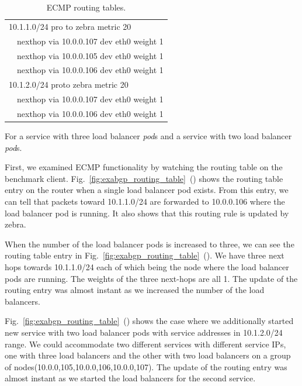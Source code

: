 {\begin{table}[h]
\begin{subtable}{.9\textwidth}
  \centering
  \begin{tabular}{ll}
    \hline
    \multicolumn{2}{l}{10.1.1.0/24 pro to zebra metric 20 } \\
    \hspace{15 mm}
    & nexthop via 10.0.0.107  dev eth0 weight 1 \\
    & nexthop via 10.0.0.105  dev eth0 weight 1 \\
    & nexthop via 10.0.0.106  dev eth0 weight 1 \\
    \multicolumn{2}{l}{10.1.2.0/24 proto zebra metric 20 } \\
    \hspace{15 mm}
    & nexthop via 10.0.0.107  dev eth0 weight 1 \\
    & nexthop via 10.0.0.106  dev eth0 weight 1 \\
    \hline
  \end{tabular}
  \caption{For a service with three load balancer {\em pod}s and a service with two load balancer {\em pod}s.}
  \label{tab:double_svc}
\end{subtable}

\caption{ECMP routing tables.}
\label{tab:exabgp_routing_table}
\end{table}
}

First, we examined ECMP functionality by watching the routing table on the benchmark client.
Fig.~\ref{fig:exabgp_routing_table}~() shows the routing table entry on the router when a single load balancer pod exists.
From this entry, we can tell that packets toward 10.1.1.0/24 are forwarded to 10.0.0.106 where the load balancer pod is running.
It also shows that this routing rule is updated by zebra.

When the number of the load balancer pods is increased to three, we can see the routing table entry in Fig.~\ref{fig:exabgp_routing_table}~().
We have three next hops towards 10.1.1.0/24 each of which being the node where the load balancer pods are running.
The weights of the three next-hops are all 1.
The update of the routing entry was almost instant as we increased the number of the load balancers.

Fig.~\ref{fig:exabgp_routing_table}~() shows the case where we additionally started new service with two load balancer pods with service addresses in 10.1.2.0/24 range.
We could accommodate two different services with different service IPs, one with three load balancers and the other with two load balancers on a group of nodes(10.0.0,105,10.0.0,106,10.0.0,107).
The update of the routing entry was almost instant as we started the load balancers for the second service.

